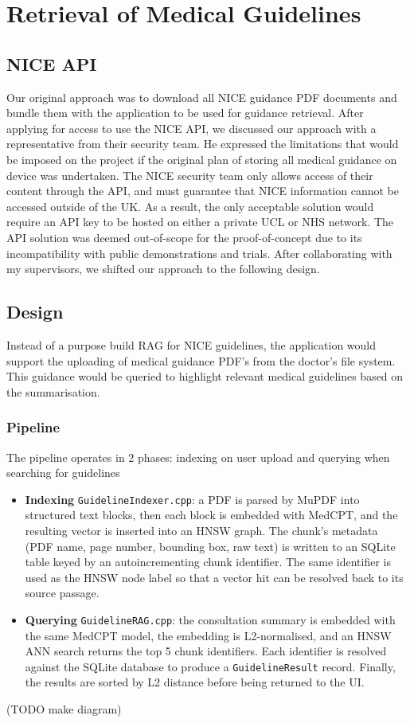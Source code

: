 \section{Retrieval of Medical Guidelines}
\subsection{NICE API}
Our original approach was to download all NICE guidance PDF documents and bundle them with the application to be used for guidance retrieval. After applying for access to use the NICE API, we discussed our approach with a representative from their security team. He expressed the limitations that would be imposed on the project if the original plan of storing all medical guidance on device was undertaken. The NICE security team only allows access of their content through the API, and must guarantee that NICE information cannot be accessed outside of the UK. As a result, the only acceptable solution would require an API key to be hosted on either a private UCL or NHS network. The API solution was deemed out-of-scope for the proof-of-concept due to its incompatibility with public demonstrations and trials. After collaborating with my supervisors, we shifted our approach to the following design. 

\subsection{Design}
Instead of a purpose build RAG for NICE guidelines, the application would support the uploading of medical guidance PDF's from the doctor's file system. This guidance would be queried to highlight relevant medical guidelines based on the summarisation.

\subsubsection{Pipeline}
The pipeline operates in 2 phases: indexing on user upload and querying when searching for guidelines
\begin{itemize}
    \item \textbf{Indexing} \texttt{GuidelineIndexer.cpp}: a PDF is parsed by MuPDF into structured text blocks, then each block is embedded with MedCPT, and the resulting vector is inserted into an HNSW graph. The chunk's metadata (PDF name, page number, bounding box, raw text) is written to an SQLite table keyed by an autoincrementing chunk identifier. The same identifier is used as the HNSW node label so that a vector hit can be resolved back to its source passage.
    \item \textbf{Querying} \texttt{GuidelineRAG.cpp}: the consultation summary is embedded with the same MedCPT model, the embedding is L2-normalised, and an HNSW ANN search returns the top 5 chunk identifiers. Each identifier is resolved against the SQLite database to produce a \texttt{GuidelineResult} record. Finally, the results are sorted by L2 distance before being returned to the UI.
\end{itemize} (TODO make diagram)

